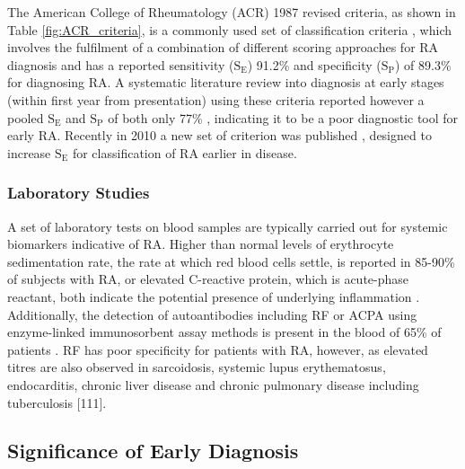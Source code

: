 \documentclass[twoside]{bhamthesis}
\theoremstyle{definition}
\begin{document}
The American College of Rheumatology (ACR) 1987 revised criteria, as shown in Table \ref{fig:ACR_criteria}, is a commonly used set of classification criteria \cite{arnett1988american}, which involves the fulfilment of a combination of different scoring approaches for RA diagnosis and has a reported sensitivity ($\mathrm{S_E}$) 91.2\% and specificity ($\mathrm{S_P}$) of 89.3\% for diagnosing RA. A systematic literature review into diagnosis at early stages (within first year from presentation) using these criteria reported however a pooled $\mathrm{S_E}$ and $\mathrm{S_P}$ of both only 77\% \cite{banal2008sensitivity}, indicating it to be a poor diagnostic tool for early RA. Recently in 2010 a new set of criterion was published \cite{aletaha20102010}, designed to increase $\mathrm{S_E}$ for classification of RA earlier in disease.

\subsubsection{Laboratory Studies}

A set of laboratory tests on blood samples are typically carried out for systemic biomarkers indicative of RA. Higher than normal levels of erythrocyte sedimentation rate, the rate at which red blood cells settle, is reported in 85-90\% of subjects with RA, or elevated C-reactive protein, which is acute-phase reactant, both indicate the potential presence of underlying inflammation \cite{bluett2014association}. Additionally, the detection of autoantibodies including RF or ACPA using enzyme-linked immunosorbent assay methods is present in the blood of 65\% of patients \cite{aletaha20102010}. RF has poor specificity for patients with RA, however, as elevated titres are also observed in sarcoidosis, systemic lupus erythematosus, endocarditis, chronic liver disease and chronic pulmonary disease including tuberculosis [111].
 




\subsection{Significance of Early Diagnosis}
\end{document}
